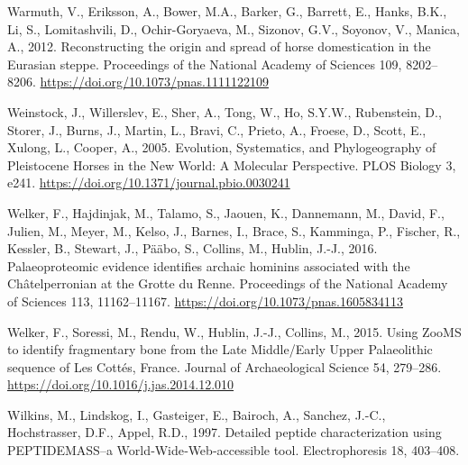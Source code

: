 \documentclass[preprint, 3p, authoryear]{elsarticle} %
\newlength{\cslhangindent}
\newlength{\cslentryspacingunit} %
\newenvironment{CSLReferences}[2] %
 {%
  \setlength{\parindent}{0pt}
  \ifodd #1
  \let\oldpar\par
  \def\par{\hangindent=\cslhangindent\oldpar}
  \fi
  \setlength{\parskip}{#2\cslentryspacingunit}
 }%
 {}
\begin{document}
\begin{CSLReferences}{1}{0}
\leavevmode{}%
Warmuth, V., Eriksson, A., Bower, M.A., Barker, G., Barrett, E., Hanks, B.K., Li, S., Lomitashvili, D., Ochir-Goryaeva, M., Sizonov, G.V., Soyonov, V., Manica, A., 2012. Reconstructing the origin and spread of horse domestication in the {Eurasian} steppe. Proceedings of the National Academy of Sciences 109, 8202--8206. \url{https://doi.org/10.1073/pnas.1111122109}

\leavevmode{}%
Weinstock, J., Willerslev, E., Sher, A., Tong, W., Ho, S.Y.W., Rubenstein, D., Storer, J., Burns, J., Martin, L., Bravi, C., Prieto, A., Froese, D., Scott, E., Xulong, L., Cooper, A., 2005. Evolution, {Systematics}, and {Phylogeography} of {Pleistocene Horses} in the {New World}: {A Molecular Perspective}. PLOS Biology 3, e241. \url{https://doi.org/10.1371/journal.pbio.0030241}

\leavevmode{}%
Welker, F., Hajdinjak, M., Talamo, S., Jaouen, K., Dannemann, M., David, F., Julien, M., Meyer, M., Kelso, J., Barnes, I., Brace, S., Kamminga, P., Fischer, R., Kessler, B., Stewart, J., Pääbo, S., Collins, M., Hublin, J.-J., 2016. Palaeoproteomic evidence identifies archaic hominins associated with the {Châtelperronian} at the {Grotte} du {Renne}. Proceedings of the National Academy of Sciences 113, 11162--11167. \url{https://doi.org/10.1073/pnas.1605834113}

\leavevmode{}%
Welker, F., Soressi, M., Rendu, W., Hublin, J.-J., Collins, M., 2015. Using {ZooMS} to identify fragmentary bone from the {Late Middle}/{Early Upper Palaeolithic} sequence of {Les Cottés}, {France}. Journal of Archaeological Science 54, 279--286. \url{https://doi.org/10.1016/j.jas.2014.12.010}

\leavevmode{}%
Wilkins, M., Lindskog, I., Gasteiger, E., Bairoch, A., Sanchez, J.-C., Hochstrasser, D.F., Appel, R.D., 1997. Detailed peptide characterization using {PEPTIDEMASS}--a {World}‐{Wide}‐{Web}‐accessible tool. Electrophoresis 18, 403--408.

\end{CSLReferences}
\end{document}
